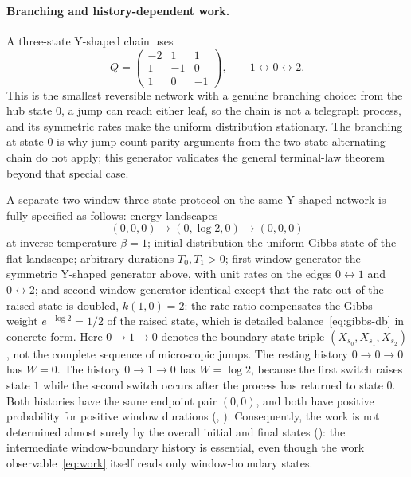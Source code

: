 \paragraph{Branching and history-dependent work.}
A three-state Y-shaped chain uses
\[
  Q=
  \begin{pmatrix}
    -2 & 1 & 1\\
     1 &-1 & 0\\
     1 & 0 &-1
  \end{pmatrix},
  \qquad 1\leftrightarrow0\leftrightarrow2.
\]
This is the smallest reversible network with a genuine branching choice: from the hub state $0$, a jump can reach either leaf, so the chain is not a telegraph process, and its symmetric rates make the uniform distribution stationary. The branching at state $0$ is why jump-count parity arguments from the two-state alternating chain do not apply; this generator validates the general terminal-law theorem beyond that special case.

A separate two-window three-state protocol on the same Y-shaped network is fully specified as follows: energy landscapes
\[
  (0,0,0)\longrightarrow(0,\log 2,0)\longrightarrow(0,0,0)
\]
at inverse temperature $\beta=1$; initial distribution the uniform Gibbs state of the flat landscape; arbitrary durations $T_0,T_1>0$; first-window generator the symmetric Y-shaped generator above, with unit rates on the edges $0\leftrightarrow1$ and $0\leftrightarrow2$; and second-window generator identical except that the rate out of the raised state is doubled, $k(1,0)=2$: the rate ratio compensates the Gibbs weight $e^{-\log 2}=1/2$ of the raised state, which is detailed balance~\eqref{eq:gibbs-db} in concrete form. Here $0\to1\to0$ denotes the boundary-state triple $(X_{s_0},X_{s_1},X_{s_2})$, not the complete sequence of microscopic jumps. The resting history $0\to0\to0$ has $W=0$. The history $0\to1\to0$ has $W=\log 2$, because the first switch raises state $1$ while the second switch occurs after the process has returned to state $0$. Both histories have the same endpoint pair $(0,0)$, and both have positive probability for positive window durations (, ). Consequently, the work is not determined almost surely by the overall initial and final states (): the intermediate window-boundary history is essential, even though the work observable~\eqref{eq:work} itself reads only window-boundary states.

